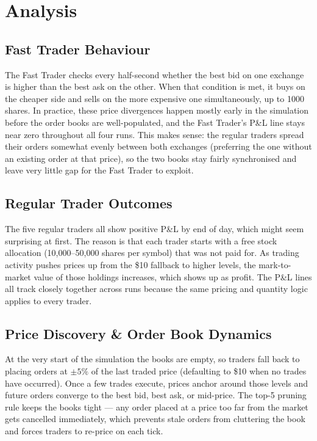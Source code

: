 \documentclass[11pt, a4paper]{article}
\begin{document}
\section{Analysis}

\subsection{Fast Trader Behaviour}

The Fast Trader checks every half-second whether the best bid on one exchange is higher than the best ask on the other. When that condition is met, it buys on the cheaper side and sells on the more expensive one simultaneously, up to 1000 shares. In practice, these price divergences happen mostly early in the simulation before the order books are well-populated, and the Fast Trader's P\&L line stays near zero throughout all four runs. This makes sense: the regular traders spread their orders somewhat evenly between both exchanges (preferring the one without an existing order at that price), so the two books stay fairly synchronised and leave very little gap for the Fast Trader to exploit.

\subsection{Regular Trader Outcomes}

The five regular traders all show positive P\&L by end of day, which might seem surprising at first. The reason is that each trader starts with a free stock allocation (10,000--50,000 shares per symbol) that was not paid for. As trading activity pushes prices up from the \$10 fallback to higher levels, the mark-to-market value of those holdings increases, which shows up as profit. The P\&L lines all track closely together across runs because the same pricing and quantity logic applies to every trader.

\subsection{Price Discovery \& Order Book Dynamics}

At the very start of the simulation the books are empty, so traders fall back to placing orders at $\pm5\%$ of the last traded price (defaulting to \$10 when no trades have occurred). Once a few trades execute, prices anchor around those levels and future orders converge to the best bid, best ask, or mid-price. The top-5 pruning rule keeps the books tight — any order placed at a price too far from the market gets cancelled immediately, which prevents stale orders from cluttering the book and forces traders to re-price on each tick.
\end{document}
